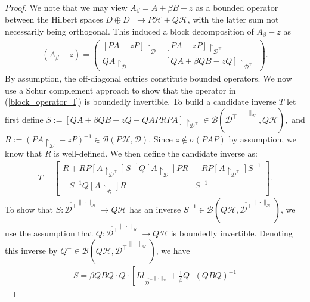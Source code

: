 \documentclass[reqno,12pt,letterpaper]{amsart}
\numberwithin{equation}{section}
\newcommand{\1}{\mathds{1}}
\theoremstyle{definition}
\begin{document}
\begin{proof}
	We note that we may view  $A_\beta = A + \beta B -z$ as a bounded operator between the Hilbert spaces $D \oplus D^\intercal \rightarrow P\mathcal{H} +Q \mathcal{H}$, with the latter sum not necessarily being orthogonal. This induced a block decomposition of $A_\beta -z$ as 
	\begin{align}\label{block_operator_I}
	(A_\beta  - z)
		=
		\begin{pmatrix}
			[PA - zP]\restriction_{\mathcal{D}} & [PA - zP]\restriction_{\mathcal{D}^\intercal}   \\
			QA\restriction_{\mathcal{D}}    & [QA + \beta QB - zQ]\restriction_{\mathcal{D}^\intercal}
		\end{pmatrix}.
	\end{align}
	By assumption, the off-diagonal entries constitute bounded operators. 
We now use a Schur complement approach to show that the operator in (\ref{block_operator_I}) is boundedly invertible. To build  a candidate inverse $T$ let first define 	$ 	S := [QA + \beta QB - zQ - QAP R PA]\restriction_{\mathcal{D}^\intercal}  \in \mathcal{B}(\overline{\mathcal{D}^\intercal}^{\| \cdot \|_{\mathcal{H}}}, Q  \mathcal{H}),
$
and 	$
R := (PA\restriction_{\mathcal{D}} - zP)^{-1} \in \mathcal{B}(P  \mathcal{H}, \mathcal{D})$. 
 Since $z \notin \sigma(PAP)$ by assumption, we know that $R$ is well-defined. We then define the candidate inverse as:
\begin{align}\label{def_block_inverse}
	T =
	\begin{bmatrix}
		R + R P[A\restriction_{\mathcal{D}^{\intercal}}] S^{-1} Q[A\restriction_{\mathcal{D}}]P R & -R P[A\restriction_{\mathcal{D}^{\intercal}}]S^{-1} \\
		- S^{-1} Q[A\restriction_{\mathcal{D}}] R & S^{-1}
	\end{bmatrix}.
\end{align}
To show that $S: \overline{\mathcal{D}^\intercal}^{\|\cdot\|_{\mathcal{H}}} \rightarrow Q\mathcal{H} $  has an inverse $S^{-1} \in \mathcal{B}(Q \mathcal{H}, \overline{\mathcal{D}^\intercal}^{\|\cdot\|_{\mathcal{H}}})$, we use the assumption that $Q: \overline{\mathcal{D}^\intercal}^{\|\cdot\|_{\mathcal{H}}} \rightarrow Q\mathcal{H}$ is boundedly invertible. Denoting this inverse by $Q^- \in \mathcal{B}(Q \mathcal{H}, \overline{\mathcal{D}^\intercal}^{\|\cdot\|_{\mathcal{H}}})$, we have 
\begin{align}
	S = \beta QBQ \cdot Q \cdot  \left[Id_{\overline{\mathcal{D}^\intercal}^{\|\cdot\|_{\mathcal{H}}} }+\frac{1}{\beta}Q^{-}(QBQ)^{-1}   

\end{align}
\end{proof}
\end{document}
